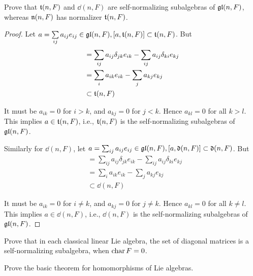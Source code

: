 \begin{ex}
  Prove that $\tt(n, F)$ and $\dd(n, F)$ are self-normalizing subalgebras of $\gl(n, F)$, whereas $\nn(n, F)$ has normalizer $\tt(n, F)$.
\end{ex}
\begin{proof}
  Let $a = \sum\limits_{ij} a_{ij}e_{ij} \in \gl(n, F), [a, \tt(n, F)] \subset \tt(n, F)$. But
  \begin{align*}
    [a, e_{kk}] &= \sum_{ij} a_{ij}\delta_{jk}e_{ik} - \sum_{ij} a_{ij}\delta_{ki}e_{kj} \\
                      &= \sum_{i} a_{ik}e_{ik} - \sum_{j} a_{kj}e_{kj} \\
                      &\subset \tt(n, F)
  \end{align*}

  It must be $a_{ik} = 0$ for $i > k$, and $a_{kj} = 0$ for $j < k$. Hence $a_{kl} = 0$ for all $k > l$. This implies $a \in \tt(n, F)$, i.e., $\tt(n, F)$ is the self-normalizing subalgebras of $\gl(n, F)$.

  Similarly for $\dd(n, F)$, let $a = \sum_{ij} a_{ij}e_{ij} \in \gl(n, F), [a, \dd(n, F)] \subset \dd(n, F)$. But
  \begin{align*}
    [a, e_{kk}] &= \sum_{ij} a_{ij}\delta_{jk}e_{ik} - \sum_{ij} a_{ij}\delta_{ki}e_{kj} \\
                      &= \sum_{i} a_{ik}e_{ik} - \sum_{j} a_{kj}e_{kj} \\
                      &\subset \dd(n, F)
  \end{align*}

  It must be $a_{ik} = 0$ for $i \neq k$, and $a_{kj} = 0$ for $j \neq k$. Hence $a_{kl} = 0$ for all $k \neq l$. This implies $a \in \dd(n, F)$, i.e., $\dd(n, F)$ is the self-normalizing subalgebras of $\gl(n, F)$.
\end{proof}

\begin{ex}\label{2.8}
  Prove that in each classical linear Lie algebra, the set of diagonal matrices is a self-normalizing subalgebra, when $\Char F = 0$.
\end{ex}

\begin{ex}
  Prove the basic theorem for homomorphisms of Lie algebras.
\end{ex}

